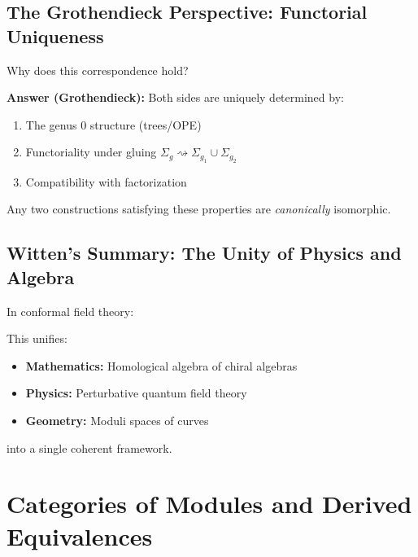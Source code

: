 \subsection{The Grothendieck Perspective: Functorial Uniqueness}

Why does this correspondence hold?

\textbf{Answer (Grothendieck):} Both sides are uniquely determined by:
\begin{enumerate}
\item The genus 0 structure (trees/OPE)
\item Functoriality under gluing $\Sigma_g \rightsquigarrow \Sigma_{g_1} \cup \Sigma_{g_2}$
\item Compatibility with factorization
\end{enumerate}

Any two constructions satisfying these properties are \emph{canonically} isomorphic.

\subsection{Witten's Summary: The Unity of Physics and Algebra}

In conformal field theory:
\begin{center}
\end{center}

This unifies:
\begin{itemize}
\item \textbf{Mathematics:} Homological algebra of chiral algebras
\item \textbf{Physics:} Perturbative quantum field theory
\item \textbf{Geometry:} Moduli spaces of curves
\end{itemize}

into a single coherent framework.


\section{Categories of Modules and Derived Equivalences}

